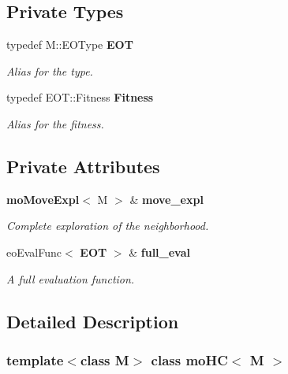 \subsection*{Private Types}
\begin{CompactItemize}
\item 
typedef M::EOType {\bf EOT}\label{classmo_h_c_d219296ede03c679646bce2fe8ff96cb}

\begin{CompactList}\small\item\em Alias for the type. \item\end{CompactList}\item 
typedef EOT::Fitness {\bf Fitness}\label{classmo_h_c_56487c97a7cf0c423cc879d1bbd45027}

\begin{CompactList}\small\item\em Alias for the fitness. \item\end{CompactList}\end{CompactItemize}
\subsection*{Private Attributes}
\begin{CompactItemize}
\item 
{\bf mo\-Move\-Expl}$<$ M $>$ \& {\bf move\_\-expl}\label{classmo_h_c_f6bfb4553fb699f1e08f7d9c37d06103}

\begin{CompactList}\small\item\em Complete exploration of the neighborhood. \item\end{CompactList}\item 
eo\-Eval\-Func$<$ {\bf EOT} $>$ \& {\bf full\_\-eval}\label{classmo_h_c_4b0d5cc70fc3d83f59a48b2bdea65736}

\begin{CompactList}\small\item\em A full evaluation function. \item\end{CompactList}\end{CompactItemize}


\subsection{Detailed Description}
\subsubsection*{template$<$class M$>$ class mo\-HC$<$ M $>$}

